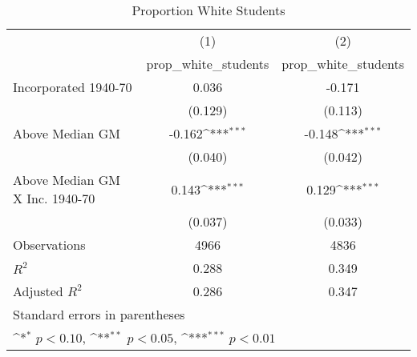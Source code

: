\begin{table}[htbp]\centering
\def\sym#1{\ifmmode^{#1}\else\(^{#1}\)\fi}
\caption{Proportion White Students}
\begin{tabular}{l*{2}{c}}
\hline\hline
                    &\multicolumn{1}{c}{(1)}&\multicolumn{1}{c}{(2)}\\
                    &\multicolumn{1}{c}{prop\_white\_students}&\multicolumn{1}{c}{prop\_white\_students}\\
\hline
Incorporated 1940-70&       0.036         &      -0.171         \\
                    &     (0.129)         &     (0.113)         \\
[1em]
Above Median GM     &      -0.162\sym{***}&      -0.148\sym{***}\\
                    &     (0.040)         &     (0.042)         \\
[1em]
Above Median GM X Inc. 1940-70&       0.143\sym{***}&       0.129\sym{***}\\
                    &     (0.037)         &     (0.033)         \\
\hline
Observations        &        4966         &        4836         \\
\(R^{2}\)           &       0.288         &       0.349         \\
Adjusted \(R^{2}\)  &       0.286         &       0.347         \\
\hline\hline
\multicolumn{3}{l}{\footnotesize Standard errors in parentheses}\\
\multicolumn{3}{l}{\footnotesize \sym{*} \(p<0.10\), \sym{**} \(p<0.05\), \sym{***} \(p<0.01\)}\\
\end{tabular}
\end{table}
